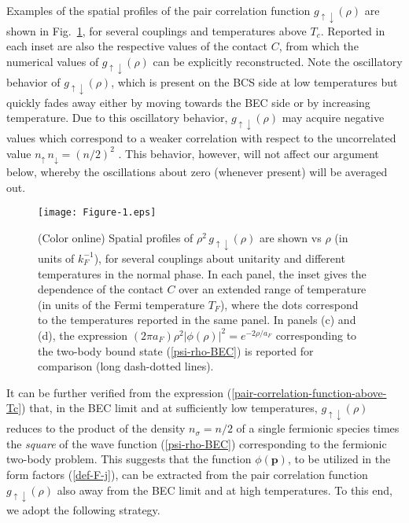 \documentclass[pra,twocolumn,aps,amssymb,showpacs,superscriptaddress]{revtex4-1}
\begin{document}
Examples of the spatial profiles of the pair correlation function $g_{\uparrow \downarrow}(\rho)$ are shown in Fig.~\ref{Figure-1}, for several couplings and temperatures above $T_{c}$.
Reported in each inset are also the respective values of the contact $C$, from which the numerical values of $g_{\uparrow \downarrow}(\rho)$ can be explicitly reconstructed.
Note the oscillatory behavior of $g_{\uparrow \downarrow}(\rho)$, which is present on the BCS side at low temperatures but quickly fades away either by moving towards the BEC side or by increasing temperature.
Due to this oscillatory behavior, $g_{\uparrow \downarrow}(\rho)$ may acquire negative values which correspond to a weaker correlation with respect to the uncorrelated value $n_{\uparrow} \, n_{\downarrow} =(n/2)^{2}$ \cite{Palestini-2014}.
This behavior, however, will not affect our argument below, whereby the oscillations about zero (whenever present) will be averaged out.

\begin{figure}[t]
\begin{center}
\texttt{[image: Figure-1.eps]}
\caption{(Color online) Spatial profiles of $\rho^{2} \, g_{\uparrow \downarrow}(\rho)$ are shown vs $\rho$ (in units of $k_{F}^{-1}$), for several couplings about unitarity and different temperatures 
                                     in the normal phase. In each panel, the inset gives the dependence of the contact $C$ over an extended range of temperature (in units of the Fermi temperature $T_{F}$), 
                                     where the dots correspond to the temperatures reported in the same panel. In panels (c) and (d), the expression $(2\pi a_F)\rho^{2} |\phi(\rho)|^2=e^{-2\rho/a_F}$ corresponding to the two-body bound state  (\ref{psi-rho-BEC}) is reported for comparison (long dash-dotted lines).}
\label{Figure-1}
\end{center}
\end{figure} 


It can be further verified from the expression (\ref{pair-correlation-function-above-Tc}) that, in the BEC limit and at sufficiently low temperatures, $g_{\uparrow \downarrow}(\rho)$ reduces to the product  
of the density $n_{\sigma} = n/2$ of a single fermionic species times the \emph{square} of the wave function (\ref{psi-rho-BEC}) corresponding to the fermionic two-body problem.
This suggests that the function $\phi(\mathbf{p})$, to be utilized in the form factors (\ref{def-F-j}), can be extracted from  the pair correlation function $g_{\uparrow \downarrow}(\rho)$ also away from the BEC limit and at high temperatures.
To this end, we adopt the following strategy.
\end{document}

